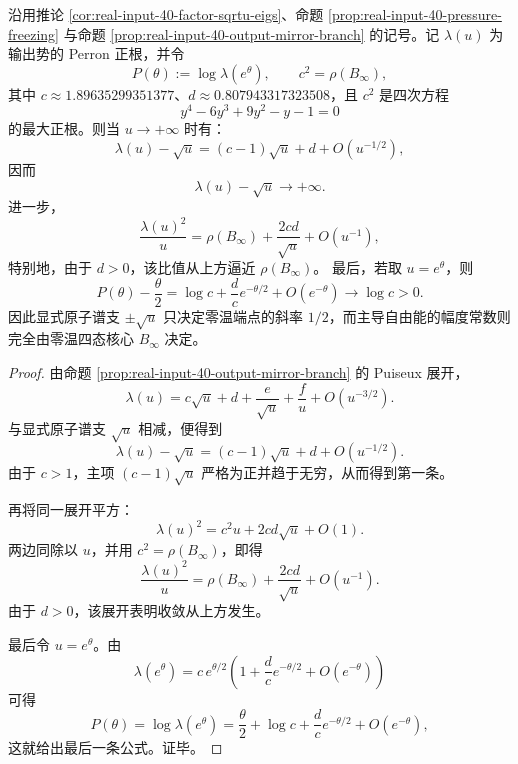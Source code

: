 \begin{theorem}\label{thm:xi-time-part73-perron-vs-atomic-sqrtu-separation}
沿用推论 \ref{cor:real-input-40-factor-sqrtu-eigs}、命题 \ref{prop:real-input-40-pressure-freezing} 与命题 \ref{prop:real-input-40-output-mirror-branch} 的记号。记 \(\lambda(u)\) 为输出势的 Perron 正根，并令
\[
P(\theta):=\log\lambda(e^\theta),
\qquad
c^2=\rho(B_\infty),
\]
其中 \(c\approx 1.89635299351377\)、\(d\approx 0.807943317323508\)，且 \(c^2\) 是四次方程
\[
y^4-6y^3+9y^2-y-1=0
\]
的最大正根。则当 \(u\to+\infty\) 时有：
\[
\boxed{\;
\lambda(u)-\sqrt u
=
(c-1)\sqrt u+d+O(u^{-1/2}),\;}
\]
因而
\[
\boxed{\;
\lambda(u)-\sqrt u\longrightarrow +\infty.\;}
\]
进一步，
\[
\boxed{\;
\frac{\lambda(u)^2}{u}
=
\rho(B_\infty)+\frac{2cd}{\sqrt u}+O(u^{-1}),\;}
\]
特别地，由于 \(d>0\)，该比值从上方逼近 \(\rho(B_\infty)\)。
最后，若取 \(u=e^\theta\)，则
\[
\boxed{\;
P(\theta)-\frac{\theta}{2}
=
\log c+\frac{d}{c}e^{-\theta/2}+O(e^{-\theta})
\longrightarrow
\log c>0.\;}
\]
因此显式原子谱支 \(\pm\sqrt u\) 只决定零温端点的斜率 \(1/2\)，而主导自由能的幅度常数则完全由零温四态核心 \(B_\infty\) 决定。
\end{theorem}
\begin{proof}
由命题 \ref{prop:real-input-40-output-mirror-branch} 的 Puiseux 展开，
\[
\lambda(u)=c\sqrt u+d+\frac{e}{\sqrt u}+\frac{f}{u}+O(u^{-3/2}).
\]
与显式原子谱支 \(\sqrt u\) 相减，便得到
\[
\lambda(u)-\sqrt u
=
(c-1)\sqrt u+d+O(u^{-1/2}).
\]
由于 \(c>1\)，主项 \((c-1)\sqrt u\) 严格为正并趋于无穷，从而得到第一条。

再将同一展开平方：
\[
\lambda(u)^2
=
c^2u+2cd\sqrt u+O(1).
\]
两边同除以 \(u\)，并用 \(c^2=\rho(B_\infty)\)，即得
\[
\frac{\lambda(u)^2}{u}
=
\rho(B_\infty)+\frac{2cd}{\sqrt u}+O(u^{-1}).
\]
由于 \(d>0\)，该展开表明收敛从上方发生。

最后令 \(u=e^\theta\)。由
\[
\lambda(e^\theta)
=
c\,e^{\theta/2}
\left(
1+\frac{d}{c}e^{-\theta/2}+O(e^{-\theta})
\right)
\]
可得
\[
P(\theta)
=
\log\lambda(e^\theta)
=
\frac{\theta}{2}+\log c+\frac{d}{c}e^{-\theta/2}+O(e^{-\theta}),
\]
这就给出最后一条公式。证毕。
\end{proof}



